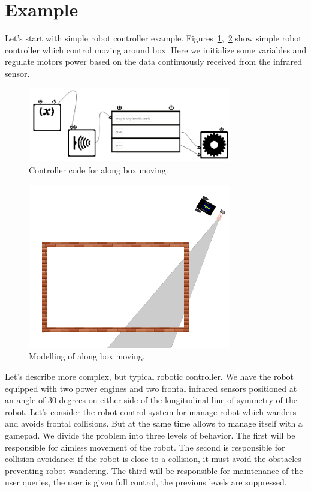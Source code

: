 \documentclass[conference,compsoc]{IEEEtran}
\begin{document}
\section{Example}
\label{sec:example}
Let's start with simple robot controller example. Figures~\ref{image:boxC},~\ref{image:box} show simple robot controller which control moving around box. Here we initialize some variables and regulate motors power based on the data continuously received from the infrared sensor. 


\begin{figure}[ht]
	\centering
	\includegraphics[width=3.5in]{alongBoxCode.png}
	\caption{Controller code for along box moving.}
	\label{image:boxC}
\end{figure}

\begin{figure}[ht]
	\centering
	\includegraphics[width=3.5in]{alongBoxModel.png}
	\caption{Modelling of along box moving.}
	\label{image:box}
\end{figure}

Let's describe more complex, but typical robotic controller. We have the robot equipped with two power engines and two frontal infrared sensors positioned at an angle of 30 degrees on either side of the longitudinal line of symmetry of the robot. Let's consider the robot control system for manage robot which wanders and avoids frontal collisions. But at the same time allows to manage itself with a gamepad. We divide the problem into three levels of behavior. The first will be responsible for aimless movement of the robot. The second is responsible for collision avoidance: if the robot is close to a collision, it must avoid the obstacles preventing robot wandering. The third will be responsible for maintenance of the user queries, the user is given full control, the previous levels are suppressed.
\end{document}

